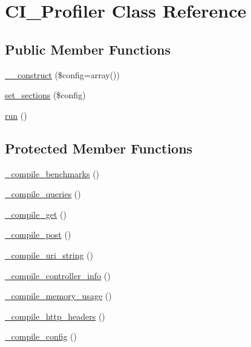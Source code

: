 \hypertarget{class_c_i___profiler}{\section{C\-I\-\_\-\-Profiler Class Reference}
\label{class_c_i___profiler}
}
\subsection*{Public Member Functions}
\begin{DoxyCompactItemize}
\item 
\hyperlink{class_c_i___profiler_af7f9493844d2d66e924e3c1df51ce616}{\-\_\-\-\_\-construct} (\$config=array())
\item 
\hyperlink{class_c_i___profiler_a81c587d7a2a249d05f28c96a135591f7}{set\-\_\-sections} (\$config)
\item 
\hyperlink{class_c_i___profiler_afb0fafe7e02a3ae1993c01c19fad2bae}{run} ()
\end{DoxyCompactItemize}
\subsection*{Protected Member Functions}
\begin{DoxyCompactItemize}
\item 
\hyperlink{class_c_i___profiler_acecf392de9d6129d3843c64fca7a4766}{\-\_\-compile\-\_\-benchmarks} ()
\item 
\hyperlink{class_c_i___profiler_a5d16e69fed0307c51b9479ebbb2049b6}{\-\_\-compile\-\_\-queries} ()
\item 
\hyperlink{class_c_i___profiler_a94ef351d1234fe87ee3f5cd7c855f8a5}{\-\_\-compile\-\_\-get} ()
\item 
\hyperlink{class_c_i___profiler_a42ae55500668793b1cec3d79b6ea9209}{\-\_\-compile\-\_\-post} ()
\item 
\hyperlink{class_c_i___profiler_a781803c49bf0c92d47187c76ebb42a1b}{\-\_\-compile\-\_\-uri\-\_\-string} ()
\item 
\hyperlink{class_c_i___profiler_a46a079522432af283c844f043ba5a513}{\-\_\-compile\-\_\-controller\-\_\-info} ()
\item 
\hyperlink{class_c_i___profiler_a409e57ba71d0463bb684925e2c6a5658}{\-\_\-compile\-\_\-memory\-\_\-usage} ()
\item 
\hyperlink{class_c_i___profiler_a80a22812f0243b3daaf78e3614bddadb}{\-\_\-compile\-\_\-http\-\_\-headers} ()
\item 
\hyperlink{class_c_i___profiler_affb7543f1c67a5b3ff24eaefcec37e6d}{\-\_\-compile\-\_\-config} ()
\end{DoxyCompactItemize}

